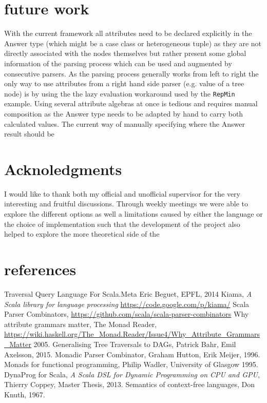 \section{future work}
With the current framework all attributes need to be declared explicitly in the Answer type (which might be a case class or heterogeneous tuple) as they are not directly associated with the nodes themselves but rather present some global information of the parsing process which can be used and augmented by consecutive parsers.
As the parsing process generally works from left to right the only way to use attributes from a right hand side parser (e.g. value of a tree node) is by using the the lazy evaluation workaround used by the \verb/RepMin/ example. 
Using several attribute algebras at once is tedious and requires manual composition as the Answer type needs to be adapted by hand to carry both calculated values.
The current way of manually specifying where the Answer result should be 

\section{Acknoledgments}
I would like to thank both my official and unofficial supervisor for the very interesting and fruitful discussions. Through weekly meetings we were able to explore the different options as well a limitations caused by either the language or the choice of implementation such that the development of the project also helped to explore the more theoretical side of the 

\section{references}

\begin{thebibliography}{9}
  Traversal Query Language For Scala.Meta
  Eric Beguet, EPFL,
  2014
  Kiama,
  \emph{A Scala library for language processing}
  \url{https://code.google.com/p/kiama/}
  Scala Parser Combinators,
  \url{https://github.com/scala/scala-parser-combinators}
  Why attribute grammars matter,
  The Monad Reader,
  \url{https://wiki.haskell.org/The_Monad.Reader/Issue4/Why_Attribute_Grammars_Matter}
  2005.
  Generalising Tree Traversals to DAGs,
  Patrick Bahr, Emil Axelsson,
  2015.
  Monadic Parser Combinator,
  Graham Hutton, Erik Meijer,
  1996.
  Monads for functional programming,
  Philip Wadler, University of Glasgow
  1995.
  DynaProg for Scala,
  \emph{A Scala DSL for Dynamic Programming on CPU and GPU},
  Thierry Coppey, Master Thesis,
  2013.
  Semantics of context-free languages,
  Don Knuth,
  1967.
\end{thebibliography}
